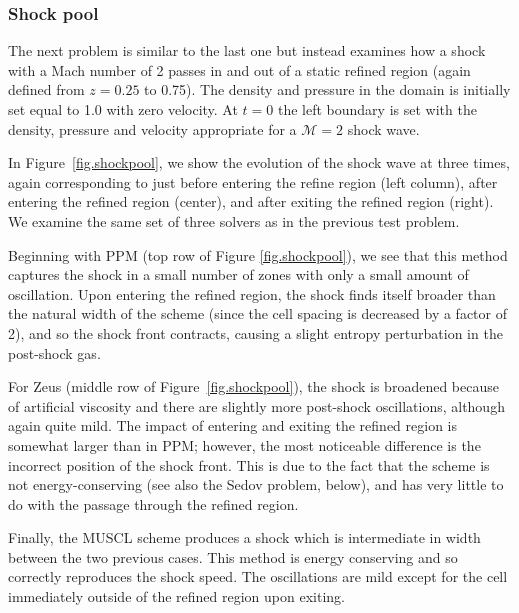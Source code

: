 \subsubsection{Shock pool}
\label{sec.tests.shockpool}

The next problem is similar to the last one but instead examines how a shock with a Mach number of 2 passes in and out of a static refined region (again defined from $z=0.25$ to 0.75).  The density and pressure in the domain is initially set equal to 1.0 with zero velocity.  At $t=0$ the left boundary is set with the density, pressure and velocity appropriate for a $\mathcal{M}=2$ shock wave.

In Figure~\ref{fig.shockpool}, we show the evolution of the shock wave at three times, again corresponding to just before entering the refine region (left column), after entering the refined region (center), and after exiting the refined region (right).  We examine the same set of three solvers as in the previous test problem.

Beginning with PPM (top row of Figure \ref{fig.shockpool}), we see that this method captures the shock in a small number of zones with only a small amount of oscillation.  Upon entering the refined region, the shock finds itself broader than the natural width of the scheme (since the cell spacing is decreased by a factor of 2), and so the shock front contracts, causing a slight entropy perturbation in the post-shock gas. 

For Zeus (middle row of Figure~\ref{fig.shockpool}), the shock is broadened because of artificial viscosity and there are slightly more post-shock oscillations, although again quite mild.  The impact of entering and exiting the refined region is somewhat larger than in PPM; however, the most noticeable difference is the incorrect position of the shock front. This is due to the fact that the scheme is not energy-conserving (see also the Sedov problem, below), and has very little to do with the passage through the refined region.

Finally, the MUSCL scheme produces a shock which is intermediate in width between the two previous cases.  This method is energy conserving and so correctly reproduces the shock speed.  The oscillations are mild except for the cell immediately outside of the refined region upon exiting.


